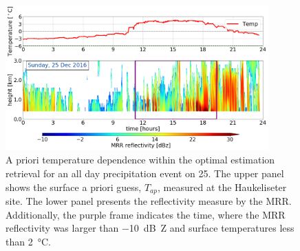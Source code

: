 \begin{figure}[b!]
	\centering
	\includegraphics[width=0.9\textwidth]{./fig_MRR/MRR_sfcT_20161225}
	\caption{A priori temperature dependence within the optimal estimation retrieval for an all day precipitation event on \SI{25}{\dec}. The upper panel shows the surface a priori guess, $T_{ap}$, measured at the Haukeliseter site. The lower panel presents the reflectivity measure by the MRR. Additionally, the purple frame indicates the time, where the MRR reflectivity was larger than \SI{-10}{\dB Z} and surface temperatures less than \SI{2}{\celsius}. }\label{fig:MRR_sfcT}
\end{figure}